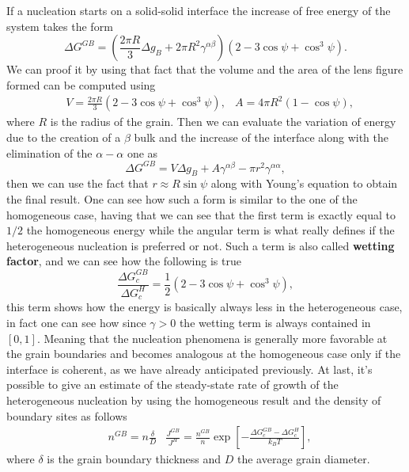 {
    If a nucleation starts on a solid-solid interface the increase of free energy of the system takes the form
    \begin{equation}
        \Delta G^{GB} = \left( \frac{2\pi R}{3}\Delta g_B + 2\pi R^2\gamma^{\alpha\beta} \right)\left( 2 - 3\cos\psi + \cos^3\psi \right).
    \end{equation}
}
{
    We can proof it by using that fact that the volume and the area of the lens figure formed can be computed using
    \begin{align}
        &V = \frac{2\pi R}{3}( 2 - 3\cos\psi + \cos^3\psi ), &A = 4\pi R^2(1- \cos\psi),
    \end{align}
    where $R$ is the radius of the grain. Then we can evaluate the variation of energy due to the creation of a $\beta$ bulk and the increase of the interface along with the elimination of the $\alpha-\alpha$ one as
    \begin{equation}
        \Delta G^{GB} = V\Delta g_B + A\gamma^{\alpha\beta} - \pi r^2\gamma^{\alpha\alpha},
    \end{equation}
    then we can use the fact that $r \approx R\sin\psi$ along with Young's equation to obtain the final result.
}
\noindent
One can see how such a form is similar to the one of the homogeneous case, having that we can see that the first term is exactly equal to $1/2$ the homogeneous energy while the angular term is what really defines if the heterogeneous nucleation is preferred or not. Such a term is also called \textbf{wetting factor}, and we can see how the following is true
\begin{equation}
    \frac{\Delta G_c^{GB}}{\Delta G_c^H} = \frac{1}{2}\left( 2 - 3\cos\psi + \cos^3\psi \right),
\end{equation}
this term shows how the energy is basically always less in the heterogeneous case, in fact one can see how since $\gamma > 0$ the wetting term is always contained in $[0, 1]$. Meaning that the nucleation phenomena is generally more favorable at the grain boundaries and becomes analogous at the homogeneous case only if the interface is coherent, as we have already anticipated previously. At last, it's possible to give an estimate of the steady-state rate of growth of the heterogeneous nucleation by using the homogeneous result and the density of boundary sites  as follows
\begin{align}
    &n^{GB} = n\frac{\delta}{D} &\frac{J^{GB}}{J^H} = \frac{n^{GB}}{n}\exp\left[ -\frac{\Delta G_c^{GB} - \Delta G_c^H}{k_BT} \right],
\end{align}
where $\delta$ is the grain boundary thickness and $D$ the average grain diameter.

